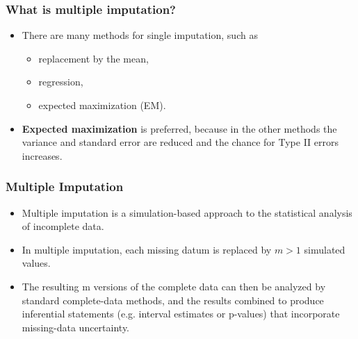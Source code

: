 \documentclass[MASTER.tex]{subfiles}
\begin{document}
\begin{frame}
	\frametitle{What is multiple imputation?}
	\Large
\begin{itemize}
\item There are many methods for single imputation, such as {
	\LARGE
	\begin{itemize}
\item replacement by the mean, 
\item regression,
\item expected maximization (EM). 
\end{itemize}
}
\item \textbf{Expected maximization} is preferred, because in the other methods
the variance and standard error are reduced and the chance for Type II errors increases. 
\end{itemize}

\end{frame}

\begin{frame}
	\frametitle{Multiple Imputation}
\Large
\begin{itemize}
\item	Multiple imputation is a simulation-based approach to the statistical analysis of incomplete data. 
\item In multiple imputation, each missing datum is replaced by $m>1$ simulated values. 
\item The resulting m versions of the complete data can then be analyzed by standard complete-data methods, and the results combined to produce inferential statements (e.g. interval estimates or p-values) that incorporate missing-data uncertainty.
\end{itemize}	
	
\end{frame}
\end{document}
